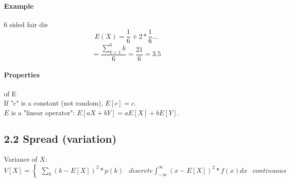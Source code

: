 \documentclass{article}
\newcommand{\p}[1]{\paragraph{#1}} %
\begin{document}
		\p{Example} 6 sided fair die\\
		\[
			E(X) = \frac{1}{6} + 2 * \frac{1}{6} ...
		\]
		\[
			= \frac{\sum_{k=1}^{6} k}{6} = \frac{21}{6} = 3.5
		\]
		
		\p{Properties} of E \\
		If "c" is a constant (not random), $E[c] = c$. \\
		$E$ is a "linear operator": $E[aX + bY] = aE[X] + bE[Y]$.
		
		\subsection{2.2 Spread (variation)}
		Variance of $X$:
		\[
			V[X] = \left\{
			\begin{array}{lr}
				\sum_{k}^{} (k - E[X])^2 * p(k) & discrete
				\int_{-\infty}^{\infty} (x-E[X])^2 * f(x) dx & continuous
			\end{array}
			\right.
		\]
		
\end{document}
